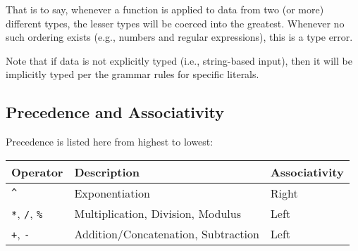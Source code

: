 That is to say, whenever a function is applied to data from two (or
more) different types, the lesser types will be coerced into the
greatest. Whenever no such ordering exists (e.g., numbers and regular
expressions), this is a type error.

Note that if data is not explicitly typed (i.e., string-based input),
then it will be implicitly typed per the grammar rules for specific
literals.


\subsection{Precedence and Associativity}

Precedence is listed here from highest to lowest:

\begin{center}\begin{tabular}{lll}
  Operator                            & Description                         & Associativity \\ \hline
  \texttt{\^{}}                       & Exponentiation                      & Right \\
  \texttt{*}, \texttt{/}, \texttt{\%} & Multiplication, Division, Modulus   & Left \\
  \texttt{+}, \texttt{-}              & Addition/Concatenation, Subtraction & Left
\end{tabular}\end{center}
